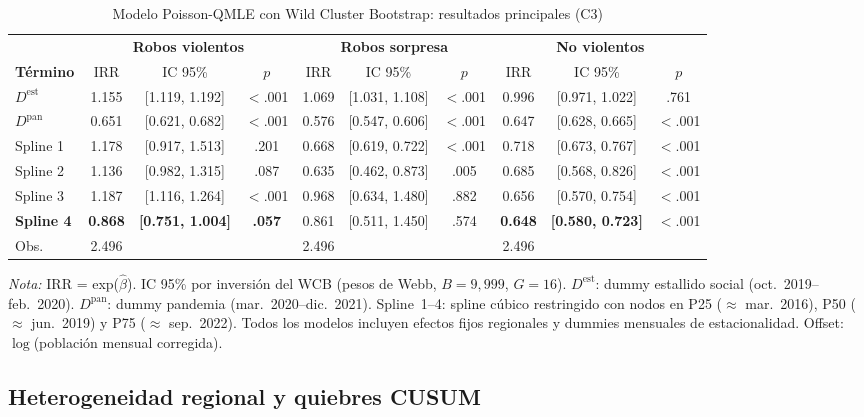 \documentclass[12pt,a4paper]{article}
\newcommand{\tablenote}[1]{%
  \vspace{2pt}%
  \begin{minipage}{\linewidth}%
    \footnotesize\textit{Nota:} #1%
  \end{minipage}%
}
\begin{document}
\begin{table}[H]
\centering
\caption{Modelo Poisson-QMLE con Wild Cluster Bootstrap: resultados principales (C3)}
\label{tab:poisson}
\footnotesize
\begin{tabular}{l@{\hskip 3mm}ccc@{\hskip 4mm}ccc@{\hskip 4mm}ccc}
\toprule
 & \multicolumn{3}{c}{\textbf{Robos violentos}} & \multicolumn{3}{c}{\textbf{Robos sorpresa}} & \multicolumn{3}{c}{\textbf{No violentos}} \\
\cmidrule(lr){2-4}\cmidrule(lr){5-7}\cmidrule(lr){8-10}
\textbf{T\'ermino} & IRR & IC 95\% & $p$ & IRR & IC 95\% & $p$ & IRR & IC 95\% & $p$ \\
\midrule
$D^{\text{est}}$ & 1.155 & [1.119, 1.192] & $<$.001 & 1.069 & [1.031, 1.108] & $<$.001 & 0.996 & [0.971, 1.022] & .761 \\
$D^{\text{pan}}$ & 0.651 & [0.621, 0.682] & $<$.001 & 0.576 & [0.547, 0.606] & $<$.001 & 0.647 & [0.628, 0.665] & $<$.001 \\
\midrule
Spline 1    & 1.178 & [0.917, 1.513] & .201 & 0.668 & [0.619, 0.722] & $<$.001 & 0.718 & [0.673, 0.767] & $<$.001 \\
Spline 2    & 1.136 & [0.982, 1.315] & .087 & 0.635 & [0.462, 0.873] & .005 & 0.685 & [0.568, 0.826] & $<$.001 \\
Spline 3    & 1.187 & [1.116, 1.264] & $<$.001 & 0.968 & [0.634, 1.480] & .882 & 0.656 & [0.570, 0.754] & $<$.001 \\
\textbf{Spline 4} & \textbf{0.868} & \textbf{[0.751, 1.004]} & \textbf{.057} & 0.861 & [0.511, 1.450] & .574 & \textbf{0.648} & \textbf{[0.580, 0.723]} & $<$.001 \\
\midrule
Obs. & 2.496 & & & 2.496 & & & 2.496 & & \\
\bottomrule
\end{tabular}
\tablenote{IRR = exp($\hat{\beta}$). IC 95\% por inversi\'on del WCB (pesos de Webb,
$B=9{,}999$, $G=16$). $D^{\text{est}}$: dummy estallido social (oct.\ 2019--feb.\
2020). $D^{\text{pan}}$: dummy pandemia (mar.\ 2020--dic.\ 2021). Spline~1--4: spline
c\'ubico restringido con nodos en P25 ($\approx$ mar.\ 2016), P50 ($\approx$ jun.\ 2019)
y P75 ($\approx$ sep.\ 2022). Todos los modelos incluyen efectos fijos regionales y
dummies mensuales de estacionalidad. Offset: $\log$(poblaci\'on mensual corregida).}
\end{table}

\subsection{Heterogeneidad regional y quiebres CUSUM}
\label{sub:regional}
\end{document}
